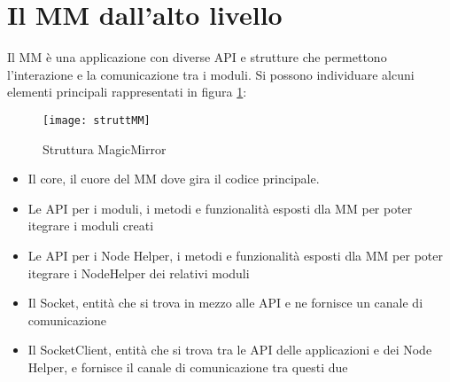 \section{Il MM dall'alto livello}
Il MM è una applicazione con diverse API e strutture che permettono l'interazione e la comunicazione tra i moduli.
Si possono individuare alcuni elementi principali rappresentati in figura \ref{fig:struttMM}:
\begin{figure}[H]
    \texttt{[image: struttMM]}
    \caption{Struttura MagicMirror}
    \label{fig:struttMM}
\end{figure}
\begin{itemize}
\item Il core, il cuore del MM dove gira il codice principale.
\item Le API per i moduli, i metodi e funzionalità esposti dla MM per poter itegrare i moduli creati
\item Le API per i Node Helper, i metodi e funzionalità esposti dla MM per poter itegrare i NodeHelper
dei relativi moduli
\item Il Socket, entità che si trova in mezzo alle API e ne fornisce un canale di comunicazione
\item Il SocketClient, entità che si trova tra le API delle applicazioni e dei Node Helper, e fornisce il canale
di comunicazione tra questi due\\[2\baselineskip]
\end{itemize}

